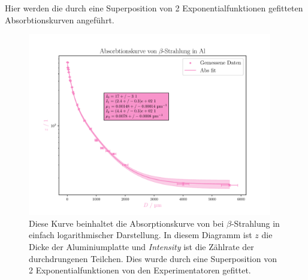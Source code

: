 \documentclass[12pt,english,ngerman]{scrartcl}
\begin{document}
Hier werden die durch eine Superposition von 2 Exponentialfunktionen gefitteten
Absorbtionskurven angeführt.

\begin{figure}[H]
	\begin{center}
		\includegraphics[width=0.95\textwidth]{figures/absorption2er.pdf}
	\end{center}
	\caption[Absorptionskurve von  bei $\beta$-Strahlung (2er Superposition
		Experimentatoren)]{
		Diese Kurve beinhaltet die Absorptionskurve von  bei
		$\beta$-Strahlung in einfach logarithmischer Darstellung. In diesem Diagramm
		ist $z$ die Dicke der Aluminiumplatte und \emph{Intensity} ist die Zählrate der
		durchdrungenen Teilchen. Dies wurde durch eine Superposition von 2
		Exponentialfunktionen von den Experimentatoren gefittet.
	}\label{fig:2er_alu_abs}
\end{figure}
\end{document}
